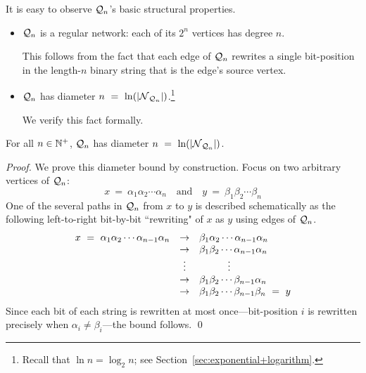 \medskip

\noindent
It is easy to observe $\mbox{$\cal Q$}_n$'s basic structural properties.
\begin{itemize}
\item 
$\mbox{$\cal Q$}_n$ is a regular network: each of its $2^n$ vertices has degree $n$.


\smallskip

This follows from the fact that each edge of $\mbox{$\cal Q$}_n$ rewrites a single bit-position in the length-$n$ binary string that is the edge's source vertex.

\medskip\item 
$\mbox{$\cal Q$}_n$ has diameter $n \ = \ \ln(|\mbox{$\cal N$}_{\mbox{{\scriptsize $\cal Q$}}_n}|)$.\footnote{Recall that $\ln n = \log_2 n$; see Section~\ref{sec:exponential+logarithm}.}


\smallskip

We verify this fact formally.
\end{itemize}

\begin{prop}
\label{thm:hypercube-diameter}
For all $n \in \mathbb{N}^+$, $\mbox{$\cal Q$}_n$ has diameter $n \ = \ \ln(|\mbox{$\cal N$}_{\mbox{{\scriptsize $\cal Q$}}_n}|)$.
\end{prop}

\begin{proof}
We prove this diameter bound by construction.  Focus on two arbitrary vertices of $\mbox{$\cal Q$}_n$:
\[ x \ = \ \alpha_1 \alpha_2 \cdots \alpha_n \ \ \ \mbox{ and } \ \ \
y \ = \ \beta_1 \beta_2 \cdots \beta_n
\]
One of the several paths in $\mbox{$\cal Q$}_n$ from $x$ to $y$ is described schematically as the following left-to-right bit-by-bit ``rewriting" of $x$ as $y$ using edges of $\mbox{$\cal Q$}_n$.
\[ \begin{array}{lcl}
x \ = \ \alpha_1 \alpha_2 \cdots \alpha_{n-1} \alpha_n
   & \rightarrow & \beta_1 \alpha_2   \cdots \alpha_{n-1} \alpha_n \\
   & \rightarrow & \beta_1 \beta_2     \cdots \alpha_{n-1} \alpha_n \\
   & \vdots & \hspace*{.4in}\vdots \\
   & \rightarrow & \beta_1 \beta_2 \cdots \beta_{n-1} \alpha_n \\
   & \rightarrow & \beta_1 \beta_2 \cdots \beta_{n-1} \beta_n \ = \ y
    \end{array}
\]
Since each bit of each string is rewritten at most once---bit-position $i$ is rewritten precisely when  $\alpha_i \neq \beta_i$---the bound follows.  \qed
\end{proof}

